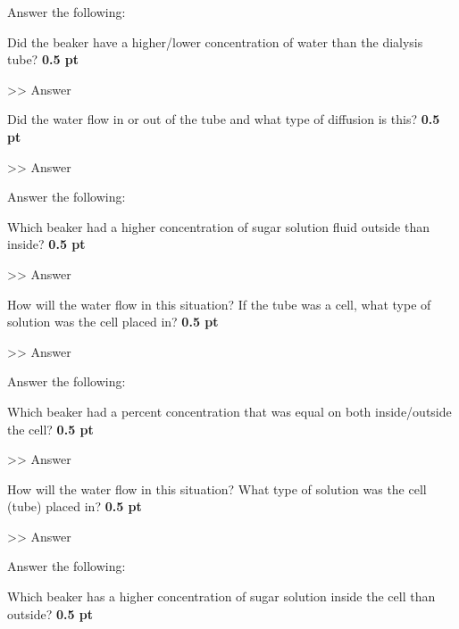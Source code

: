 \documentclass[12pt,a4paper]{article}
\begin{document}
\begin{enumerate}[font=\bfseries, wide, resume]
    {\color{under}\item Answer the following:}
    \begin{enumerate}
        {\color{under}\item Did the beaker have a higher/lower concentration of water than the dialysis tube? \textbf{0.5 pt}}

        >> Answer 

        {\color{under}\item Did the water flow in or out of the tube and what type of diffusion is this? \textbf{0.5 pt}}

        >> Answer 
    \end{enumerate}

    {\color{under}\item Answer the following:}
    \begin{enumerate}
        {\color{under}\item Which beaker had a higher concentration of sugar solution fluid outside than inside? \textbf{0.5 pt}}

        >> Answer 

        {\color{under}\item How will the water flow in this situation? If the tube was a cell, what type of solution was the cell placed in? \textbf{0.5 pt}}

        >> Answer 
    \end{enumerate}

    {\color{under}\item Answer the following:}
    \begin{enumerate}
        {\color{under}\item Which beaker had a percent concentration that was equal on both inside/outside the cell? \textbf{0.5 pt}}

        >> Answer 

        {\color{under}\item How will the water flow in this situation? What type of solution was the cell (tube) placed in? \textbf{0.5 pt}}

        >> Answer 
    \end{enumerate}

    {\color{under}\item Answer the following:}
    \begin{enumerate}
        {\color{under}\item Which beaker has a higher concentration of sugar solution inside the cell than outside?  \textbf{0.5 pt}}


\end{enumerate}
\end{enumerate}
\end{document}
